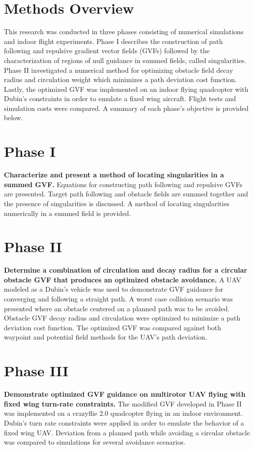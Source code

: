 \documentclass[numbered,pdftex]{ohio-etd}
\begin{document}
 \section{Methods Overview}
 
 This research was conducted in three phases consisting of numerical simulations and indoor flight experiments. Phase I describes the construction of path following and repulsive gradient vector fields (GVFs) followed by the characterization of regions of null guidance in summed fields, called singularities. Phase II investigated a numerical method for optimizing obstacle field decay radius and circulation weight which minimizes a path deviation cost function. Lastly, the optimized GVF was implemented on an indoor flying quadcopter with Dubin's constraints in order to emulate a fixed wing aircraft. Flight tests and simulation costs were compared. A summary of each phase's objective is provided below.
 
 

 \section{Phase I}
 \textbf{Characterize and present a method of locating singularities in a summed GVF.}  Equations for constructing path following and repulsive GVFs are presented. Target path following and obstacle fields are summed together and the presence of singularities is discussed. A method of locating singularities numerically in a summed field is provided.
 
 
 
 \section{Phase II}
 \textbf{Determine a combination of circulation and decay radius for a circular obstacle GVF that produces an optimized obstacle avoidance.} A UAV modeled as a Dubin's vehicle was used to demonstrate GVF guidance for converging and following a straight path. A worst case collision scenario was presented where an obstacle centered on a planned path was to be avoided. Obstacle GVF decay radius and circulation were optimized to minimize a path deviation cost function. The optimized GVF was compared against both waypoint and potential field methods for the UAV's path deviation. 
 
 \section{Phase III}
 \textbf{Demonstrate optimized GVF guidance on multirotor UAV flying with fixed wing turn-rate constraints.} The modified GVF developed in Phase II was implemented on a crazyflie 2.0 quadcopter flying in an indoor environment.  Dubin's turn rate constraints were applied in order to emulate the behavior of a fixed wing UAV. Deviation from a planned path while avoiding a circular obstacle was compared to simulations for several avoidance scenarios.
\end{document}
